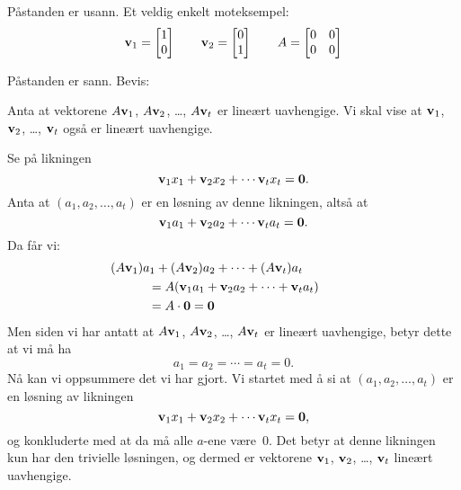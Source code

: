 \begin{losning}

\begin{punkt}
Påstanden er usann.
Et veldig enkelt moteksempel:
\[
\mathbf{v}_1 = \begin{bmatrix} 1 \\ 0 \end{bmatrix}\qquad
\mathbf{v}_2 = \begin{bmatrix} 0 \\ 1 \end{bmatrix}\qquad
A =
\begin{bmatrix}
0 & 0 \\
0 & 0 \end{bmatrix}
\]
\end{punkt}


\begin{punkt}
Påstanden er sann.  Bevis:

Anta at vektorene
$A \mathbf{v}_1$, $A \mathbf{v}_2$, \ldots, $A \mathbf{v}_t$
er lineært uavhengige.
Vi skal vise at
$\mathbf{v}_1$, $\mathbf{v}_2$, \ldots, $\mathbf{v}_t$
også er lineært uavhengige.

Se på likningen
\[
\mathbf{v}_1 x_1 + \mathbf{v}_2 x_2 + \cdots \mathbf{v}_t x_t = \mathbf{0}.
\]
Anta at $(a_1, a_2, \ldots, a_t)$ er en løsning av denne likningen,
altså at
\[
\mathbf{v}_1 a_1 + \mathbf{v}_2 a_2 + \cdots \mathbf{v}_t a_t = \mathbf{0}.
\]
Da får vi:
\begin{align*}
& \!\!\!\!\!\!\!\!\!\!\!\!\!\!\!\!\!\!
(A \v_1) a_1 + (A \v_2) a_2 + \cdots + (A \v_t) a_t \\
&= A (\v_1 a_1 + \v_2 a_2 + \cdots + \v_t a_t) \\
&= A \cdot \0 = \0
\end{align*}
Men siden vi har antatt at
$A \mathbf{v}_1$, $A \mathbf{v}_2$, \ldots, $A \mathbf{v}_t$
er lineært uavhengige, betyr dette at vi må ha
\[
a_1 = a_2 = \cdots = a_t = 0.
\]
Nå kan vi oppsummere det vi har gjort.
Vi startet med å si at
$(a_1, a_2, \ldots, a_t)$
er en løsning av likningen
\[
\mathbf{v}_1 x_1 + \mathbf{v}_2 x_2 + \cdots \mathbf{v}_t x_t = \mathbf{0},
\]
og konkluderte med at da må alle $a$-ene være~$0$.
Det betyr at denne likningen kun har den trivielle løsningen,
og dermed er vektorene
$\mathbf{v}_1$, $\mathbf{v}_2$, \ldots, $\mathbf{v}_t$
lineært uavhengige.
%
%
%
%
\end{punkt}



\end{losning}



